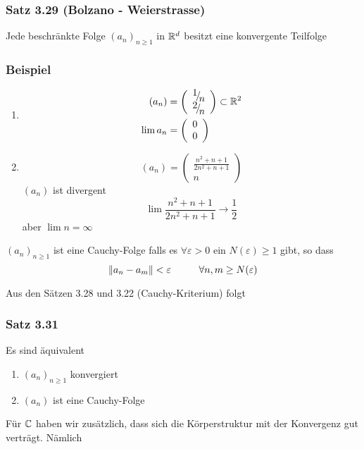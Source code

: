 \subsubsection*{Satz 3.29 (Bolzano - Weierstrasse)}
Jede beschränkte Folge $\left( a_n\right)_{n\geq 1}$ in $\mathbb{R}^d$ besitzt eine konvergente Teilfolge
\subsubsection*{Beispiel}
\begin{enumerate}
\item\begin{align*} \left( {{a_n}} \right)&= \left( {\begin{array}{*{20}{c}}
{{\raise0.7ex\hbox{$1$} \!\mathord{\left/
 {\vphantom {1 n}}\right.\kern-\nulldelimiterspace}
\!\lower0.7ex\hbox{$n$}}}\\
{{\raise0.7ex\hbox{$2$} \!\mathord{\left/
 {\vphantom {2 n}}\right.\kern-\nulldelimiterspace}
\!\lower0.7ex\hbox{$n$}}}
\end{array}} \right) \subset\R^2\\
\lim a_n&=\left( {\begin{array}{*{20}{c}}
0\\
0
\end{array}} \right) \end{align*}
\item \[\left( {{a_n}} \right) = \left( {\begin{array}{*{20}{c}}
{\frac{{{n^2} + n + 1}}{{2{n^2} + n + 1}}}\\
n
\end{array}} \right)\]
$\left( a_n\right)$ ist divergent
\[\lim \frac{{{n^2} + n + 1}}{{2{n^2} + n + 1}} \to \frac{1}{2}\] aber $\lim n=\infty$
\end{enumerate}

\begin{definition}{3.30}
$\left( a_n\right)_{n\geq 1}$ ist eine Cauchy-Folge falls es $\forall\varepsilon >0$ ein $N(\varepsilon)\geq 1$ gibt, so dass
\[\left\| {{a_n} - {a_m}} \right\| < \varepsilon \hspace{10mm}\forall n,m \ge N(\varepsilon )\]
\end{definition}
\noindent Aus den Sätzen 3.28 und 3.22 (Cauchy-Kriterium) folgt
\subsubsection*{Satz 3.31}
Es sind äquivalent
\begin{enumerate}
\item $\left( a_n\right)_{n\geq 1}$ konvergiert
\item $\left( a_n\right)$ ist eine Cauchy-Folge
\end{enumerate}
Für $\mathbb{C}$ haben wir zusätzlich, dass sich die Körperstruktur mit der Konvergenz gut verträgt. Nämlich
